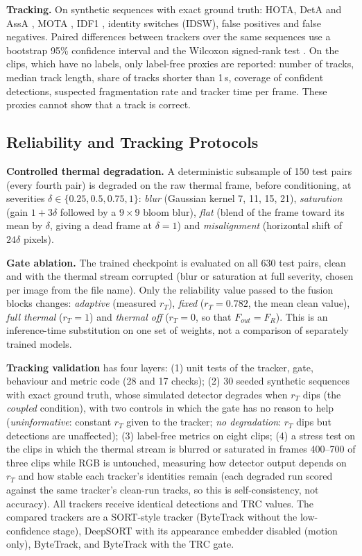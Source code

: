 \documentclass[journal]{IEEEtran}
\newcommand{\rT}{r_T}
\begin{document}
\textbf{Tracking.} On synthetic sequences with exact ground truth: HOTA, DetA and AssA \cite{hota}, MOTA \cite{clearmot}, IDF1 \cite{idf1}, identity switches (IDSW), false positives and false negatives. Paired differences between trackers over the same sequences use a bootstrap 95\% confidence interval \cite{bootstrap} and the Wilcoxon signed-rank test \cite{wilcoxon}. On the clips, which have no labels, only label-free proxies are reported: number of tracks, median track length, share of tracks shorter than 1\,s, coverage of confident detections, suspected fragmentation rate and tracker time per frame. These proxies cannot show that a track is correct.

\subsection{Reliability and Tracking Protocols}
\textbf{Controlled thermal degradation.} A deterministic subsample of 150 test pairs (every fourth pair) is degraded on the raw thermal frame, before conditioning, at severities $\delta\in\{0.25,0.5,0.75,1\}$: \emph{blur} (Gaussian kernel 7, 11, 15, 21), \emph{saturation} (gain $1+3\delta$ followed by a $9\times9$ bloom blur), \emph{flat} (blend of the frame toward its mean by $\delta$, giving a dead frame at $\delta=1$) and \emph{misalignment} (horizontal shift of $24\delta$ pixels).

\textbf{Gate ablation.} The trained checkpoint is evaluated on all 630 test pairs, clean and with the thermal stream corrupted (blur or saturation at full severity, chosen per image from the file name). Only the reliability value passed to the fusion blocks changes: \emph{adaptive} (measured $\rT$), \emph{fixed} ($\rT=0.782$, the mean clean value), \emph{full thermal} ($\rT=1$) and \emph{thermal off} ($\rT=0$, so that $F_{out}=F_R$). This is an inference-time substitution on one set of weights, not a comparison of separately trained models.

\textbf{Tracking validation} has four layers: (1) unit tests of the tracker, gate, behaviour and metric code (28 and 17 checks); (2) 30 seeded synthetic sequences with exact ground truth, whose simulated detector degrades when $\rT$ dips (the \emph{coupled} condition), with two controls in which the gate has no reason to help (\emph{uninformative}: constant $\rT$ given to the tracker; \emph{no degradation}: $\rT$ dips but detections are unaffected); (3) label-free metrics on eight clips; (4) a stress test on the clips in which the thermal stream is blurred or saturated in frames 400--700 of three clips while RGB is untouched, measuring how detector output depends on $\rT$ and how stable each tracker's identities remain (each degraded run scored against the same tracker's clean-run tracks, so this is self-consistency, not accuracy). All trackers receive identical detections and TRC values. The compared trackers are a SORT-style tracker (ByteTrack without the low-confidence stage), DeepSORT with its appearance embedder disabled (motion only), ByteTrack, and ByteTrack with the TRC gate.
\end{document}
